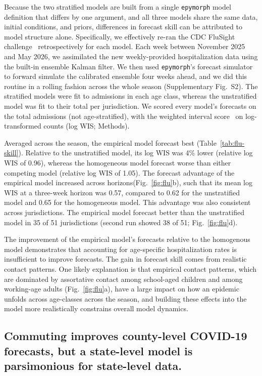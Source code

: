 Because the two stratified models are built from a single \texttt{epymorph} model definition that differs by one argument, and all three models share the same data, initial conditions, and priors, differences in forecast skill can be attributed to model structure alone. 
Specifically, we effectively re-ran the CDC FluSight challenge~\citep{cdc_flusight_2026} retrospectively for each model.
Each week between November 2025 and May 2026, we assimilated the new weekly-provided hospitalization data using the built-in ensemble Kalman filter. 
We then used \texttt{epymorph}'s forecast simulator to forward simulate the calibrated ensemble four weeks ahead, and we did this routine in a rolling fashion across the whole season (Supplementary Fig.~S2).
The stratified models were fit to admissions in each age class, whereas the unstratified model was fit to their total per jurisdiction. 
We scored every model's forecasts on the total admissions (not age-stratified), with the weighted interval score~\citep{bracher_evaluating_2021} on log-transformed counts (log WIS; Methods).

Averaged across the season, the empirical model forecast best (Table~\ref{tab:flu-skill}). 
Relative to the unstratified model, its log WIS was 4\% lower (relative log WIS of 0.96), whereas the homogeneous model forecast worse than either competing model (relative log WIS of 1.05). 
The forecast advantage of the empirical model increased across horizons(Fig.~\ref{fig:flu}b), such that its mean log WIS at a three-week horizon was 0.57, compared to 0.62 for the unstratified model and 0.65 for the homogeneous model. 
This advantage was also consistent across jurisdictions. 
The empirical model forecast better than the unstratified model in 35 of 51 jurisdictions (second run showed 38 of 51; Fig.~\ref{fig:flu}d). 

The improvement of the empirical model's forecasts relative to the homogenous model demonstrates that accounting for age-specific hospitalization rates is insufficient to improve forecasts. 
The gain in forecast skill comes from realistic contact patterns. 
One likely explanation is that empirical contact patterns, which are dominated by assortative contact among school-aged children and among working-age adults (Fig.~\ref{fig:flu}a), have a large impact on how an epidemic unfolds across age-classes across the season, and building these effects into the model more realistically constrains overall model dynamics. 

\subsection{Commuting improves county-level COVID-19 forecasts, but a state-level model is parsimonious for state-level data.}\label{sec:results-covid}

